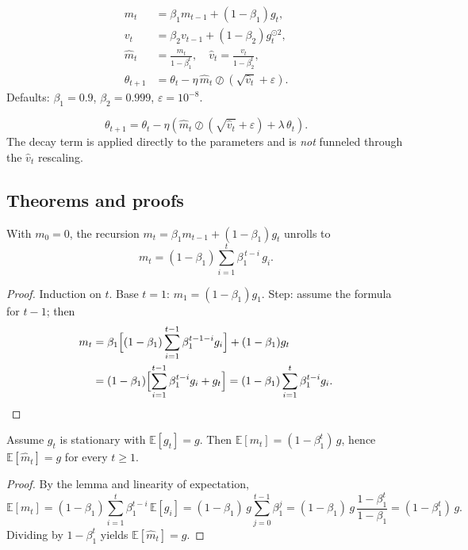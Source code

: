 \begin{definition}[Adam]
\begin{align*}
m_t &= \beta_1 m_{t-1} + (1-\beta_1) g_t, \\
v_t &= \beta_2 v_{t-1} + (1-\beta_2) g_t^{\odot 2}, \\
\hat m_t &= \frac{m_t}{1-\beta_1^t}, \quad \hat v_t = \frac{v_t}{1-\beta_2^t}, \\
\theta_{t+1} &= \theta_t - \eta\, \hat m_t \oslash (\sqrt{\hat v_t} + \varepsilon).
\end{align*}
Defaults: $\beta_1 = 0.9$, $\beta_2 = 0.999$, $\varepsilon = 10^{-8}$.
\end{definition}

\begin{definition}
\[
\theta_{t+1} = \theta_t - \eta\!\left(\hat m_t \oslash (\sqrt{\hat v_t} + \varepsilon) + \lambda\, \theta_t\right).
\]
The decay term is applied directly to the parameters and is \emph{not} funneled through the $\hat v_t$ rescaling.
\end{definition}

\subsection*{Theorems and proofs}

\begin{lemma}
With $m_0 = 0$, the recursion $m_t = \beta_1 m_{t-1} + (1-\beta_1) g_t$ unrolls to
\[
m_t = (1-\beta_1)\sum_{i=1}^{t} \beta_1^{\,t-i}\, g_i.
\]
\end{lemma}
\begin{proof}
Induction on $t$. Base $t=1$: $m_1 = (1-\beta_1) g_1$. Step: assume the formula for $t-1$; then
\begin{align*}
m_t &= \beta_1\Bigl[(1-\beta_1)\sum_{i=1}^{t-1}\beta_1^{t-1-i}g_i\Bigr] + (1-\beta_1)g_t \\
&= (1-\beta_1)\Bigl[\sum_{i=1}^{t-1}\beta_1^{t-i}g_i + g_t\Bigr] = (1-\beta_1)\sum_{i=1}^{t}\beta_1^{t-i}g_i. \qedhere
\end{align*}
\end{proof}

\begin{theorem}
Assume $g_t$ is stationary with $\mathbb{E}[g_t] = g$. Then $\mathbb{E}[m_t] = (1 - \beta_1^t)\, g$, hence $\mathbb{E}[\hat m_t] = g$ for every $t \geq 1$.
\end{theorem}
\begin{proof}
By the lemma and linearity of expectation,
\[
\mathbb{E}[m_t] = (1-\beta_1)\sum_{i=1}^t \beta_1^{t-i}\, \mathbb{E}[g_i] = (1-\beta_1)\, g \sum_{j=0}^{t-1}\beta_1^{j} = (1-\beta_1)\, g\, \frac{1 - \beta_1^t}{1-\beta_1} = (1-\beta_1^t)\, g.
\]
Dividing by $1 - \beta_1^t$ yields $\mathbb{E}[\hat m_t] = g$.
\end{proof}


